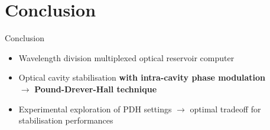 \section{Conclusion}

\begin{frame}{Conclusion}
	\begin{itemize}
		\item Wavelength division multiplexed optical reservoir computer
		\item Optical cavity stabilisation \textbf{with intra-cavity phase modulation} \\$\longrightarrow$ \textbf{Pound-Drever-Hall technique}
		\item Experimental exploration of PDH settings $\longrightarrow$ optimal tradeoff for stabilisation performances\footnotemark
	\end{itemize}
\end{frame}